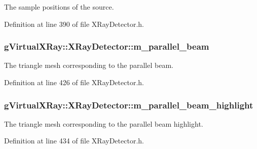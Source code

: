 The sample positions of the source. 



Definition at line 390 of file XRayDetector.h.

\hypertarget{classg_virtual_x_ray_1_1_x_ray_detector_af532ddbb920e88e98976704e56a103bb}{
\subsubsection[{m\_\-parallel\_\-beam}]{ {\bf gVirtualXRay::XRayDetector::m\_\-parallel\_\-beam}}}
\label{classg_virtual_x_ray_1_1_x_ray_detector_af532ddbb920e88e98976704e56a103bb}


The triangle mesh corresponding to the parallel beam. 



Definition at line 426 of file XRayDetector.h.

\hypertarget{classg_virtual_x_ray_1_1_x_ray_detector_a10c10c59b7b73a7b7ab2d78ee03520c9}{
\subsubsection[{m\_\-parallel\_\-beam\_\-highlight}]{ {\bf gVirtualXRay::XRayDetector::m\_\-parallel\_\-beam\_\-highlight}}}
\label{classg_virtual_x_ray_1_1_x_ray_detector_a10c10c59b7b73a7b7ab2d78ee03520c9}


The triangle mesh corresponding to the parallel beam highlight. 



Definition at line 434 of file XRayDetector.h.

